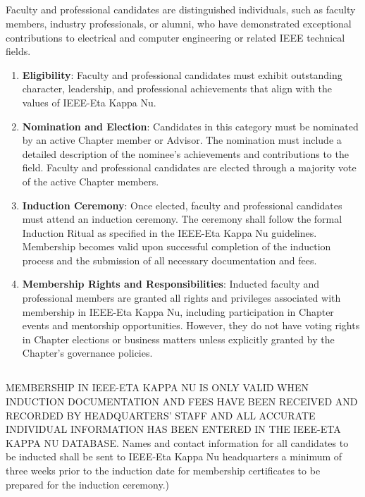 \documentclass[10pt, oneside]{article}
\begin{document}
\subsection{}

Faculty and professional candidates are distinguished individuals, such as faculty members, industry professionals, or alumni, who have demonstrated exceptional contributions to electrical and computer engineering or related IEEE technical fields.

\begin{enumerate}
    \item \textbf{Eligibility}: Faculty and professional candidates must exhibit outstanding character, leadership, and professional achievements that align with the values of IEEE-Eta Kappa Nu.

    \item \textbf{Nomination and Election}: Candidates in this category must be nominated by an active Chapter member or Advisor. The nomination must include a detailed description of the nominee’s achievements and contributions to the field. Faculty and professional candidates are elected through a majority vote of the active Chapter members.

    \item \textbf{Induction Ceremony}: Once elected, faculty and professional candidates must attend an induction ceremony. The ceremony shall follow the formal Induction Ritual as specified in the IEEE-Eta Kappa Nu guidelines. Membership becomes valid upon successful completion of the induction process and the submission of all necessary documentation and fees.

    \item \textbf{Membership Rights and Responsibilities}: Inducted faculty and professional members are granted all rights and privileges associated with membership in IEEE-Eta Kappa Nu, including participation in Chapter events and mentorship opportunities. However, they do not have voting rights in Chapter elections or business matters unless explicitly granted by the Chapter's governance policies.
\end{enumerate}

\subsection{}
MEMBERSHIP IN IEEE-ETA KAPPA NU IS ONLY VALID WHEN INDUCTION DOCUMENTATION AND FEES HAVE BEEN RECEIVED AND RECORDED BY
HEADQUARTERS’ STAFF AND ALL ACCURATE INDIVIDUAL INFORMATION HAS BEEN
ENTERED IN THE IEEE-ETA KAPPA NU DATABASE. Names and contact information for all candidates to be inducted shall be sent to IEEE-Eta Kappa Nu headquarters a minimum of three weeks prior to the induction date for membership certificates to be prepared for the induction ceremony.)
\end{document}
